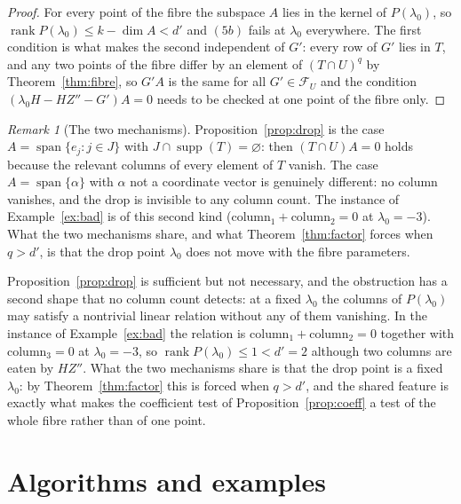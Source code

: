\documentclass[journal]{IEEEtran}
\theoremstyle{plainn}
\theoremstyle{remark}
\newtheorem{remark}[thm]{Remark}
\begin{document}
\begin{proof}
For every point of the fibre the subspace $A$ lies in the kernel of $P(\lambda_0)$, so
$\operatorname{rank}P(\lambda_0)\le k-\dim A<d'$ and $(5b)$ fails at $\lambda_0$ everywhere. The
first condition is what makes the second independent of $G'$: every row of $G'$ lies in $T$, and any two
points of the fibre differ by an element of $(T\cap U)^{q}$ by Theorem~\ref{thm:fibre}, so $G'A$ is the
same for all $G'\in\mathcal F_U$ and the condition $(\lambda_0H-HZ''-G')A=0$ needs to be checked at one
point of the fibre only.
\end{proof}

\begin{remark}[The two mechanisms]\label{rem:two-mechanisms}
Proposition~\ref{prop:drop} is the case $A=\operatorname{span}\{e_j: j\in J\}$ with
$J\cap\operatorname{supp}(T)=\varnothing$: then $(T\cap U)A=0$ holds because the relevant columns of
every element of $T$ vanish. The case $A=\operatorname{span}\{\alpha\}$ with $\alpha$ not a coordinate
vector is genuinely different: no column vanishes, and the drop is invisible to any column count. The
instance of Example~\ref{ex:bad} is of this second kind ($\text{column}_1+\text{column}_2=0$ at
$\lambda_0=-3$). What the two mechanisms share, and what Theorem~\ref{thm:factor} forces when
$q>d'$, is that the drop point $\lambda_0$ does not move with the fibre parameters.
\end{remark}

Proposition~\ref{prop:drop} is sufficient but not necessary, and the obstruction has a second shape
that no column count detects: at a fixed $\lambda_0$ the columns of $P(\lambda_0)$ may satisfy a
nontrivial linear relation without any of them vanishing. In the instance of Example~\ref{ex:bad} the
relation is $\text{column}_1+\text{column}_2=0$ together with $\text{column}_3=0$ at
$\lambda_0=-3$, so $\operatorname{rank}P(\lambda_0)\le1<d'=2$ although two columns are eaten by $HZ''$. What the two mechanisms share is that the drop point is a fixed $\lambda_0$: by
Theorem~\ref{thm:factor} this is forced when $q>d'$, and the shared feature is exactly what makes the
coefficient test of Proposition~\ref{prop:coeff} a test of the whole fibre rather than of one point.

\section{Algorithms and examples}\label{sec:algorithms}
\end{document}
